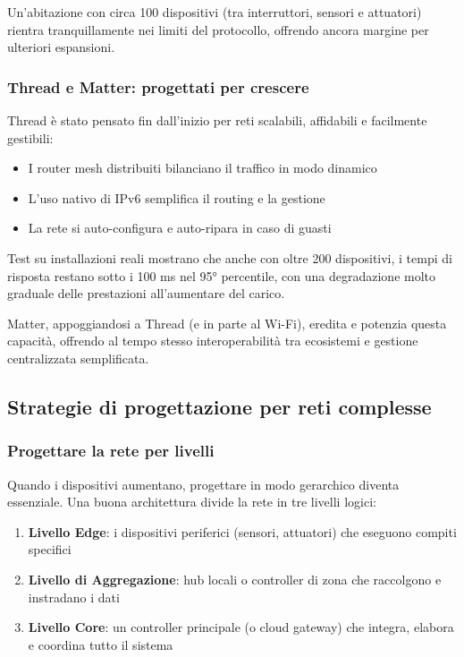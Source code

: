Un'abitazione con circa 100 dispositivi (tra interruttori, sensori e attuatori) rientra tranquillamente nei limiti del protocollo, offrendo ancora margine per ulteriori espansioni.

\subsubsection{Thread e Matter: progettati per crescere}

Thread è stato pensato fin dall’inizio per reti scalabili, affidabili e facilmente gestibili:
\begin{itemize}
    \item I router mesh distribuiti bilanciano il traffico in modo dinamico
    \item L'uso nativo di IPv6 semplifica il routing e la gestione
    \item La rete si auto-configura e auto-ripara in caso di guasti
\end{itemize}

Test su installazioni reali mostrano che anche con oltre 200 dispositivi, i tempi di risposta restano sotto i 100 ms nel 95° percentile, con una degradazione molto graduale delle prestazioni all’aumentare del carico.

Matter, appoggiandosi a Thread (e in parte al Wi-Fi), eredita e potenzia questa capacità, offrendo al tempo stesso interoperabilità tra ecosistemi e gestione centralizzata semplificata.

\subsection{Strategie di progettazione per reti complesse}

\subsubsection{Progettare la rete per livelli}

Quando i dispositivi aumentano, progettare in modo gerarchico diventa essenziale. Una buona architettura divide la rete in tre livelli logici:

\begin{enumerate}
    \item \textbf{Livello Edge}: i dispositivi periferici (sensori, attuatori) che eseguono compiti specifici
    \item \textbf{Livello di Aggregazione}: hub locali o controller di zona che raccolgono e instradano i dati
    \item \textbf{Livello Core}: un controller principale (o cloud gateway) che integra, elabora e coordina tutto il sistema
\end{enumerate}

